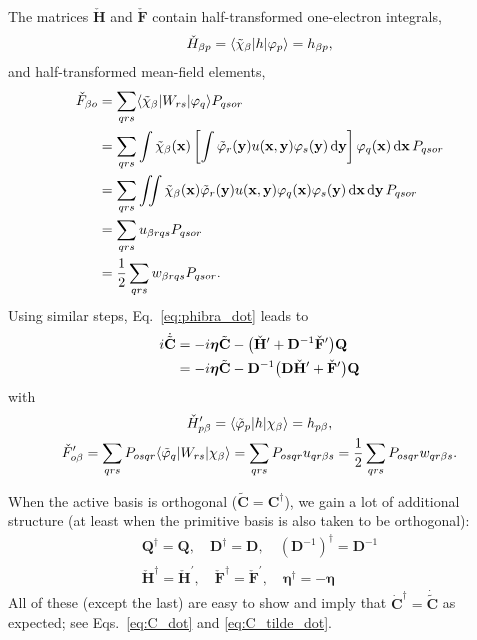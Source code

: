 \documentclass[aip,jcp,preprint,superscriptaddress,nofootinbib]{revtex4-1}
\begin{document}
The matrices $\check{\mathbf{H}}$ and $\check{\mathbf{F}}$ contain
half-transformed one-electron integrals,
\begin{gather}
    \check{H}_{\beta p} = \langle \tilde{\chi}_{\beta} \vert h \vert \varphi_{p} \rangle = h_{\beta p},
\end{gather}
and half-transformed mean-field elements,
\begin{align}
    \check{F}_{\beta o}
    &= \sum_{qrs}  \langle \tilde{\chi}_{\beta} \vert W_{rs} \vert \varphi_{q} \rangle P_{qsor} \nonumber\\
    &= \sum_{qrs}
    \int \tilde{\chi}_{\beta} (\mathbf{x}) \left[ 
    \int \tilde{\varphi}_{r}(\mathbf{y}) u(\mathbf{x}, \mathbf{y}) \varphi_{s}(\mathbf{y})  \dd{\mathbf{y}} 
    \right] \varphi_{q} (\mathbf{x}) \dd{\mathbf{x}}
    P_{qsor} \nonumber\\
    &= \sum_{qrs}
    \iint \tilde{\chi}_{\beta} (\mathbf{x}) \tilde{\varphi}_{r}(\mathbf{y}) u(\mathbf{x}, \mathbf{y}) \varphi_{q} (\mathbf{x}) \varphi_{s}(\mathbf{y}) \dd{\mathbf{x}} \dd{\mathbf{y}} 
    P_{qsor} \nonumber\\
    &= \sum_{qrs}  u_{\beta r q s} P_{qsor} \nonumber\\
    &= \frac{1}{2} \sum_{qrs}  w_{\beta r q s} P_{qsor}. \label{eq:F_check_from_u_and_rho}
\end{align}
Using similar steps, Eq.~\eqref{eq:phibra_dot} leads to
\begin{align} \label{eq:C_tilde_dot}
    i \dot{\tilde{\mathbf{C}}} 
    &= -i  \bm{\eta} \tilde{\mathbf{C}} - 
    \big( \check{\mathbf{H}}' + \mathbf{D}^{-1} \check{\mathbf{F}}' \big) \mathbf{Q} \nonumber\\
    &= -i  \bm{\eta} \tilde{\mathbf{C}} - 
    \mathbf{D}^{-1} \big( \mathbf{D} \check{\mathbf{H}}' + \check{\mathbf{F}}' \big) \mathbf{Q}
\end{align}
with
\begin{subequations} \label{eq:F_check_prime_from_u_and_rho}
    \begin{gather}
        \check{H}'_{p \beta} = \langle \tilde{\varphi}_{p} \vert h \vert \chi_{\beta} \rangle = h_{p \beta},  \\
        \check{F}'_{o \beta} 
        = \sum_{qrs} P_{osqr} \langle \tilde{\varphi}_{q} \vert  W_{rs}  \vert \chi_{\beta} \rangle
        = \sum_{qrs} P_{osqr} u_{qr\beta s}
        = \frac{1}{2} \sum_{qrs} P_{osqr} w_{qr\beta s}. \label{eq:F_check_prime_from_u_and_rho_b}
    \end{gather}
\end{subequations}

When the active basis is orthogonal ($\tilde{\mathbf{C}} = \mathbf{C}^{\dagger}$), we gain a lot of
additional structure (at least when the primitive basis is also taken to be orthogonal):
\begin{gather}
    \mathbf{Q}^{\dagger}          = \mathbf{Q}, \quad 
    \mathbf{D}^{\dagger}          = \mathbf{D}, \quad 
    (\mathbf{D}^{-1})^{\dagger}   = \mathbf{D}^{-1} \\
    \check{\mathbf{H}}^{\dagger}  = \check{\mathbf{H}}^{\prime}, \quad 
    \check{\mathbf{F}}^{\dagger}  = \check{\mathbf{F}}^{\prime}, \quad
    \bm{\eta}^{\dagger}           = -\bm{\eta}
\end{gather}
All of these (except the last) are easy to show and imply that
$\dot{\mathbf{C}}^{\dagger} = \dot{\tilde{\mathbf{C}}}$ as expected;
see Eqs.~\eqref{eq:C_dot} and \eqref{eq:C_tilde_dot}.
\end{document}
